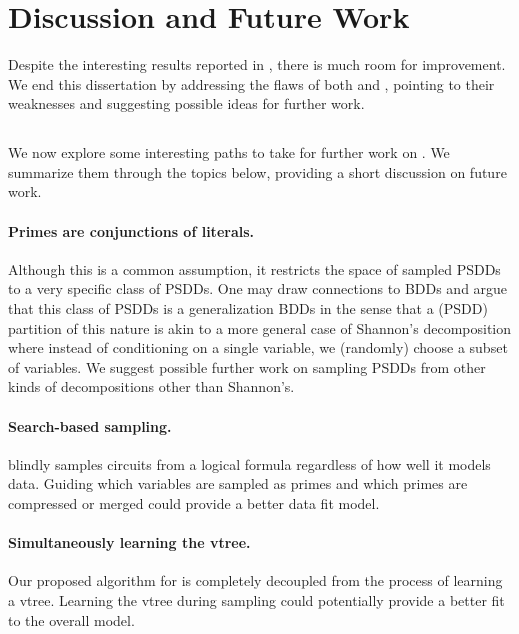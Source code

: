 \section{Discussion and Future Work}

Despite the interesting results reported in , there is much room for
improvement. We end this dissertation by addressing the flaws of both  and
, pointing to their weaknesses and suggesting possible ideas for further work.

\subsection{}

We now explore some interesting paths to take for further work on . We
summarize them through the topics below, providing a short discussion on future work.

\paragraph{Primes are conjunctions of literals.} Although this is a common assumption, it restricts
the space of sampled PSDDs to a very specific class of PSDDs. One may draw connections to BDDs and
argue that this class of PSDDs is a generalization BDDs in the sense that a (PSDD) partition of
this nature is akin to a more general case of Shannon's decomposition where instead of conditioning
on a single variable, we (randomly) choose a subset of variables. We suggest possible further work
on sampling PSDDs from other kinds of decompositions other than Shannon's.

\paragraph{Search-based sampling.}  blindly samples circuits from a logical
formula regardless of how well it models data. Guiding which variables are sampled as primes and
which primes are compressed or merged could provide a better data fit model.

\paragraph{Simultaneously learning the vtree.} Our proposed algorithm for  is
completely decoupled from the process of learning a vtree. Learning the vtree during sampling could
potentially provide a better fit to the overall model.

